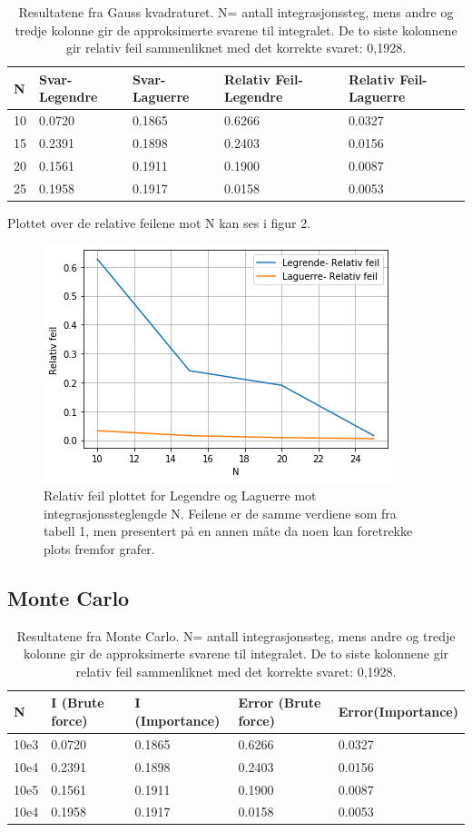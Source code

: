 \documentclass[%
oneside,                 %
final,                   %
10pt]{article}
\begin{document}
\begin{table}[H]
\begin{tabular}{l|ll|ll}
\hline
N  & Svar-Legendre & Svar-Laguerre   & Relativ Feil-Legendre & Relativ Feil-Laguerre\\
\hline
10  & 0.0720 & 0.1865 & 0.6266 & 0.0327 \\
\hline
15  & 0.2391 & 0.1898 & 0.2403 & 0.0156\\
\hline
20  & 0.1561 & 0.1911 & 0.1900 & 0.0087\\
\hline
25  & 0.1958 & 0.1917 & 0.0158 & 0.0053 \\
\end{tabular}
\caption{Resultatene fra Gauss kvadraturet. N= antall integrasjonssteg, mens andre og tredje kolonne gir de approksimerte svarene til integralet. De to siste kolonnene gir relativ feil sammenliknet med det korrekte svaret: 0,1928.}
\end{table}

\noindent Plottet over de relative feilene mot N kan ses i figur 2.

\begin{figure}[H]
\centering
\includegraphics[scale=0.8]{resultatetgauskvadrat.png}
\caption{Relativ feil plottet for Legendre og Laguerre mot integrasjonssteglengde N. Feilene er de samme verdiene som fra tabell 1, men presentert på en annen måte da noen kan foretrekke plots fremfor grafer.}
\label{fig: Grenser}
\end{figure}

\subsection{Monte Carlo}
\begin{table}[H]
\begin{tabular}{l|ll|ll}
\hline
N  & I (Brute force) & I (Importance)  & Error (Brute force) & Error(Importance)\\
\hline
10e3  & 0.0720 & 0.1865 & 0.6266 & 0.0327 \\
\hline
10e4  & 0.2391 & 0.1898 & 0.2403 & 0.0156\\
\hline
10e5  & 0.1561 & 0.1911 & 0.1900 & 0.0087\\
\hline
10e4  & 0.1958 & 0.1917 & 0.0158 & 0.0053 \\
\end{tabular}
\caption{Resultatene fra Monte Carlo. N= antall integrasjonssteg, mens andre og tredje kolonne gir de approksimerte svarene til integralet. De to siste kolonnene gir relativ feil sammenliknet med det korrekte svaret: 0,1928.}
\end{table}
\end{document}
